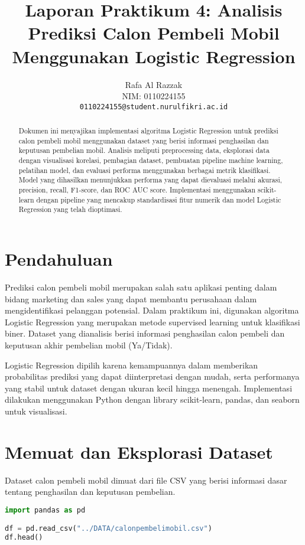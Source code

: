\documentclass[11pt,a4paper]{article}
\title{\textbf{Laporan Praktikum 4: Analisis Prediksi Calon Pembeli Mobil\\Menggunakan Logistic Regression}}
\author{Rafa Al Razzak \\ NIM: 0110224155 \\ \texttt{0110224155@student.nurulfikri.ac.id}}
\date{}
\begin{document}
    \maketitle
    \onehalfspacing

    \begin{abstract}
        Dokumen ini menyajikan implementasi algoritma Logistic Regression untuk prediksi calon pembeli mobil menggunakan dataset yang berisi informasi penghasilan dan keputusan pembelian mobil. Analisis meliputi preprocessing data, eksplorasi data dengan visualisasi korelasi, pembagian dataset, pembuatan pipeline machine learning, pelatihan model, dan evaluasi performa menggunakan berbagai metrik klasifikasi. Model yang dihasilkan menunjukkan performa yang dapat dievaluasi melalui akurasi, precision, recall, F1-score, dan ROC AUC score. Implementasi menggunakan scikit-learn dengan pipeline yang mencakup standardisasi fitur numerik dan model Logistic Regression yang telah dioptimasi.
    \end{abstract}


    \section{Pendahuluan}
    Prediksi calon pembeli mobil merupakan salah satu aplikasi penting dalam bidang marketing dan sales yang dapat membantu perusahaan dalam mengidentifikasi pelanggan potensial. Dalam praktikum ini, digunakan algoritma Logistic Regression yang merupakan metode supervised learning untuk klasifikasi biner. Dataset yang dianalisis berisi informasi penghasilan calon pembeli dan keputusan akhir pembelian mobil (Ya/Tidak).

    Logistic Regression dipilih karena kemampuannya dalam memberikan probabilitas prediksi yang dapat diinterpretasi dengan mudah, serta performanya yang stabil untuk dataset dengan ukuran kecil hingga menengah. Implementasi dilakukan menggunakan Python dengan library scikit-learn, pandas, dan seaborn untuk visualisasi.


    \section{Memuat dan Eksplorasi Dataset}
    Dataset calon pembeli mobil dimuat dari file CSV yang berisi informasi dasar tentang penghasilan dan keputusan pembelian.

    \begin{codebox}
        \begin{lstlisting}[language=Python]
import pandas as pd

df = pd.read_csv("../DATA/calonpembelimobil.csv")
df.head()
        \end{lstlisting}
    \end{codebox}
\end{document}
